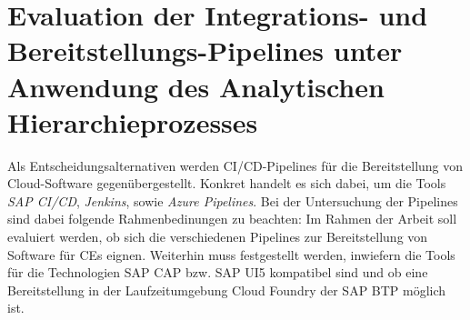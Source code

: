 \section{Evaluation der Integrations- und Bereitstellungs-Pipelines unter Anwendung des Analytischen Hierarchieprozesses}
\label{sec:AHP}
Als Entscheidungsalternativen werden CI/CD-Pipelines für die Bereitstellung von Cloud-Software gegenübergestellt. Konkret handelt es sich dabei, um die Tools \textit{SAP CI/CD}, \textit{Jenkins}, sowie \textit{Azure Pipelines}. Bei der Untersuchung der Pipelines sind dabei folgende Rahmenbedinungen zu beachten: Im Rahmen der Arbeit soll evaluiert werden, ob sich die verschiedenen Pipelines zur Bereitstellung von Software für CEs eignen. Weiterhin muss festgestellt werden, inwiefern die Tools für die Technologien SAP CAP bzw. SAP UI5 kompatibel sind und ob eine Bereitstellung in der Laufzeitumgebung Cloud Foundry der SAP BTP möglich ist. 
